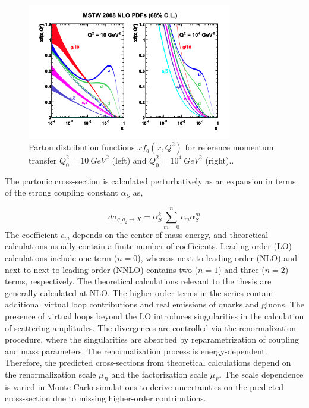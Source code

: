 \begin{figure}
\centering
    \includegraphics[width=0.8\textwidth] {figures/Theory/PDF.pdf}\hspace{1cm}
    \caption{ Parton distribution functions $xf_{q}(x,Q^2)$ for reference momentum transfer $Q^2_{0} = 10 ~ GeV^2$ (left) and $Q^2_{0} = 10^4~ GeV^{2}$ (right).\cite{PDFCalLHC}.}
\label{fig:PDFFig}
\end{figure}

The partonic cross-section is calculated perturbatively as an expansion in terms of the strong coupling constant $\alpha_{S}$ as,

\begin{equation}
\label{eqn:PartonicXS}
d\sigma_{q_{1}q_{2}\rightarrow X} = \alpha_{S}^{k} \sum_{m=0}^{n} c_{m}\alpha_{S}^{m}
\end{equation}
The coefficient $c_{m}$ depends on the center-of-mass energy, and theoretical calculations usually contain a finite number of coefficients. Leading order (LO) calculations include one term ($n=0$), whereas next-to-leading order (NLO) and next-to-next-to-leading order (NNLO) contains two ($n=1$) and three ($n=2$) terms, respectively. The theoretical calculations relevant to the thesis are generally calculated at NLO. The higher-order terms in the series contain additional virtual loop contributions and real emissions of quarks and gluons. The presence of virtual loops beyond the LO introduces singularities in the calculation of scattering amplitudes. The divergences are controlled via the renormalization procedure, where the singularities are absorbed by reparametrization of coupling and mass parameters. The renormalization process is energy-dependent. Therefore, the predicted cross-sections from theoretical calculations depend on the renormalization scale $\mu_{R}$ and the factorization scale $\mu_{F}$. The scale dependence is varied in Monte Carlo simulations to derive uncertainties on the predicted cross-section due to missing higher-order contributions. 

